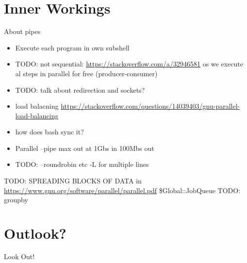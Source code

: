 \section{Inner Workings}
\begin{frame}{About pipes}
\begin{itemize}
   \item Execute each program in own subshell
   \item TODO: not sequential: \url{https://stackoverflow.com/a/32946581} os we execute al steps in parallel for free (producer-consumer) %
   \item TODO: talk about redirection and sockets?
   \item load balacning \url{https://stackoverflow.com/questions/14039403/gnu-parallel-load-balancing}
   \item how does bash sync it?
   \item Parallel --pipe max out at 1Gbs in 100Mbs out
   \item TODO: --roundrobin etc -L for multiple lines
\end{itemize}
\end{frame}
\begin{frame}
 TODO: SPREADING BLOCKS OF DATA
 in \url{https://www.gnu.org/software/parallel/parallel.pdf}
 \$Global::JobQueue
 TODO: groupby
\end{frame}

\section{Outlook?}
\begin{frame}{Look Out!}
\end{frame}

